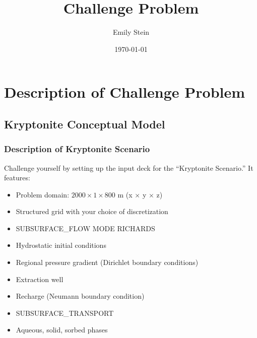 \documentclass{beamer}
\begin{document}
\title{Challenge Problem}
\author{Emily Stein}
\date{\today}


\section{Description of Challenge Problem}

\subsection{Kryptonite Conceptual Model}

\begin{frame}\frametitle{Description of Kryptonite Scenario}
Challenge yourself by setting up the input deck for the ``Kryptonite Scenario.'' It features:
\begin{itemize}
  \item Problem domain: $2000 \times 1 \times 800$ m (x $\times$ y $\times$ z)
  \item Structured grid with your choice of discretization
  \item SUBSURFACE\_FLOW MODE RICHARDS
  \item Hydrostatic initial conditions
  \item Regional pressure gradient (Dirichlet boundary conditions)
  \item Extraction well
  \item Recharge (Neumann boundary condition)
  \item SUBSURFACE\_TRANSPORT
  \item Aqueous, solid, sorbed phases
\end{itemize}

\end{frame}

\end{document}
